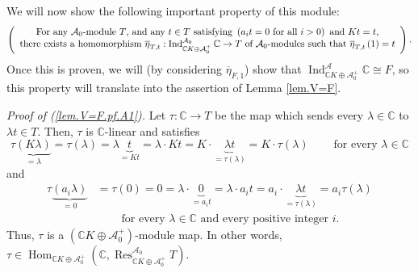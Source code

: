 \documentclass[etingof-lie.tex]{subfiles}
\begin{document}
We will now show the following important property of this module:
\begin{equation}
\left(
\begin{array}
[c]{c}%
\text{For any }\mathcal{A}_{0}\text{-module }T\text{, and any }t\in T\text{
satisfying }\left(  a_{i}t=0\text{ for all }i>0\right)  \text{ and
}Kt=t\text{,}\\
\text{there exists a homomorphism }\overline{\eta}_{T,t}:\operatorname*{Ind}%
\nolimits_{\mathbb{C}K\oplus\mathcal{A}_{0}^{+}}^{\mathcal{A}_{0}}%
\mathbb{C}\rightarrow T\text{ of }\mathcal{A}_{0}\text{-modules such that
}\overline{\eta}_{T,t}\left(  1\right)  =t
\end{array}
\right)  . \label{lem.V=F.pf.A1}%
\end{equation}
Once this is proven, we will (by considering $\overline{\eta}_{F,1}$) show
that $\operatorname*{Ind}\nolimits_{\mathbb{C}K\oplus\mathcal{A}_{0}^{+}%
}^{\mathcal{A}}\mathbb{C}\cong F$, so this property will translate into the
assertion of Lemma \ref{lem.V=F}.

\textit{Proof of (\ref{lem.V=F.pf.A1}).} Let $\tau:\mathbb{C}\rightarrow T$ be
the map which sends every $\lambda\in\mathbb{C}$ to $\lambda t\in T$. Then,
$\tau$ is $\mathbb{C}$-linear and satisfies%
\[
\tau\underbrace{\left(  K\lambda\right)  }_{=\lambda}=\tau\left(
\lambda\right)  =\lambda\underbrace{t}_{=Kt}=\lambda\cdot Kt=K\cdot
\underbrace{\lambda t}_{=\tau\left(  \lambda\right)  }=K\cdot\tau\left(
\lambda\right)  \ \ \ \ \ \ \ \ \ \ \text{for every }\lambda\in\mathbb{C}%
\]
and%
\begin{align*}
\tau\underbrace{\left(  a_{i}\lambda\right)  }_{=0}  &  =\tau\left(  0\right)
=0=\lambda\cdot\underbrace{0}_{=a_{i}t}=\lambda\cdot a_{i}t=a_{i}%
\cdot\underbrace{\lambda t}_{=\tau\left(  \lambda\right)  }=a_{i}\tau\left(
\lambda\right) \\
&  \ \ \ \ \ \ \ \ \ \ \text{for every }\lambda\in\mathbb{C}\text{ and every
positive integer }i\text{.}%
\end{align*}
Thus, $\tau$ is a $\left(  \mathbb{C}K\oplus\mathcal{A}_{0}^{+}\right)
$-module map. In other words, $\tau\in\operatorname*{Hom}\nolimits_{\mathbb{C}%
K\oplus\mathcal{A}_{0}^{+}}\left(  \mathbb{C},\operatorname*{Res}%
\nolimits_{\mathbb{C}K\oplus\mathcal{A}_{0}^{+}}^{\mathcal{A}_{0}}T\right)  $.
\end{document}
